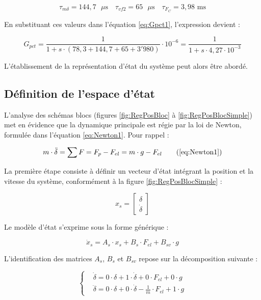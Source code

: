 \begin{equation}
    \tau_{m\delta} = 144,7 \text{ $\mu$s}\quad\tau_{vf2} = 65 \text{ $\mu$s}\quad\tau_{F_C} = 3,98 \text{ ms}
\end{equation}

En substituant ces valeurs dans l'équation \ref{eq:Gpct1}, l'expression devient :

\begin{equation}
    G_{pct} = \frac{1}{1 + s \cdot \left( 78,3 + 144,7 + 65 + 3'980 \right)}\cdot 10^{-6} = \frac{1}{1 + s \cdot 4,27\cdot 10^{-3}}
    \label{eq:Gpct1_val}
\end{equation}

L'établissement de la représentation d'état du système peut alors être abordé.

\subsection{Définition de l'espace d'état}
L'analyse des schémas blocs (figures \ref{fig:RegPosBloc} à \ref{fig:RegPosBlocSimple}) met en évidence que la dynamique principale est régie par la loi de Newton, formulée dans l'équation \ref{eq:Newton1}. Pour rappel :

\begin{equation}
    m \cdot \ddot{\delta} =\sum F = F_p - F_{el} = m \cdot g - F_{el}
    \tag{\ref{eq:Newton1}}
\end{equation}

La première étape consiste à définir un vecteur d'état intégrant la position et la vitesse du système, conformément à la figure \ref{fig:RegPosBlocSimple} :

\begin{equation}
    x_s =\left[\begin{matrix} \delta \\ \dot{\delta} \end{matrix}\right]
\end{equation}

Le modèle d'état s'exprime sous la forme générique :

\begin{equation}
    \dot{x}_s = A_s\cdot x_s + B_s\cdot F_{el} + B_{sv}\cdot g
\end{equation}

L'identification des matrices $A_s$, $B_s$ et $B_{sv}$ repose sur la décomposition suivante :

\begin{equation}
    \left\{ \begin{aligned}
         & \dot{\delta} = 0\cdot \delta + 1\cdot \dot{\delta} + 0\cdot F_{el} + 0\cdot g
        \\
         & \ddot{\delta} = 0\cdot \delta + 0\cdot \dot{\delta} - \frac{1}{m}\cdot F_{el} + 1\cdot g
    \end{aligned} \right.
\end{equation}

